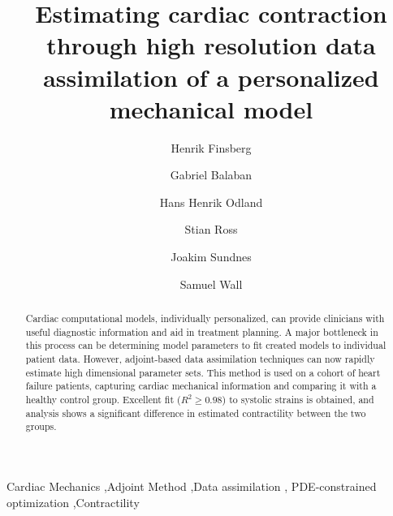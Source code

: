 \documentclass[times]{elsarticle}
\begin{document}
\begin{frontmatter}

\title{Estimating cardiac contraction through high resolution data
  assimilation of a personalized mechanical model}


\author[simula,uioinf,cci]{Henrik Finsberg}
\author[kcl]{Gabriel Balaban}
\author[uiomed,cci]{Hans Henrik Odland}
\author[uiomed,cci]{Stian Ross}
\author[simula,uioinf,cci]{Joakim Sundnes}
\author[simula,aas,cci]{Samuel Wall}

\address[simula]{Simula Research Laboratory, P.O. Box 134 1325
  Lysaker, Norway}
\address[uioinf]{Department of Informatics, University of Oslo,
  P.O. Box 1080, Blindern 0316 Oslo, Norway}
\address[uiomed]{Faculty of Medicine, University of Oslo, P.O. Box
  1078 Blindern, 0316 Oslo, Norway}
\address[cci]{Center for Cardiological Innovation, Songsvannsveien 9,
  0372 Oslo, Norway}
\address[aas]{Department of Mathematical Science and Technology,
  Norwegian University of Life Sciences,  Universitetstunet 3 1430 Ås,
  Norway}
\address[kcl]{Department of Imaging Sciences and Bioengineering,
              King's College London, St. Thomas Hospital, 
              Westminster Bridge Rd, Lambeth, London SE1 7EH, UK}
            

 
  
\begin{abstract}
  
Cardiac computational models, individually personalized, can provide
clinicians with useful diagnostic information and aid in
treatment planning.  A major bottleneck in this process can be  
determining model parameters to fit created models to individual
patient data. However, adjoint-based data assimilation techniques can
now rapidly estimate high dimensional parameter sets.  This method is
used on a cohort of heart failure patients, capturing cardiac mechanical
information and comparing it with a healthy control group.  Excellent
fit ($R^2 \geq 0.98$) to systolic strains is obtained, and analysis
shows a significant difference in estimated contractility between the
two groups.

\end{abstract}

\begin{keyword}

Cardiac Mechanics \sep Adjoint Method \sep Data assimilation \sep
PDE-constrained optimization \sep Contractility 
\end{keyword}

\end{frontmatter}
\end{document}
